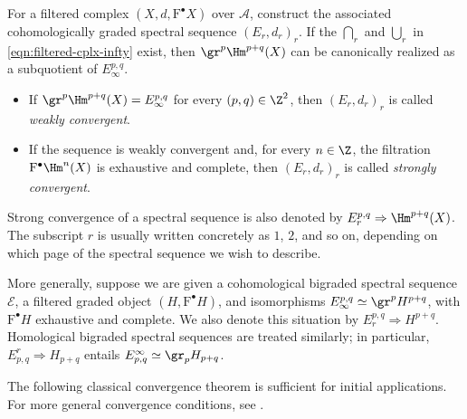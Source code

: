 \begin{definition}\label{def:filtered-cplx-convergence}
	For a filtered complex $(X,d,\mathrm{F}^\bullet X)$ over $\mathcal{A}$,
	construct the associated cohomologically graded spectral sequence
	$(E_r,d_r)_r$. If the $\bigcap_r$ and $\bigcup_r$ in
	\eqref{eqn:filtered-cplx-infty} exist, then
	$\gr^p\Hm^{p+q}(X)$ can be canonically realized as a subquotient of
	$E_\infty^{p,q}$.
	\begin{itemize}
		\item If $\gr^p\Hm^{p+q}(X)=E_\infty^{p,q}$ for every
		$(p,q)\in\Z^2$, then $(E_r,d_r)_r$ is called \emph{weakly convergent}.
		\item If the sequence is weakly convergent and, for every $n\in\Z$,
		the filtration $\mathrm{F}^\bullet\Hm^n(X)$ is exhaustive and complete,
		then $(E_r,d_r)_r$ is called \emph{strongly convergent}.
	\end{itemize}
\end{definition}

\begin{convention}\label{con:ss-conv}
	Strong convergence of a spectral sequence is also denoted by
	$E_r^{p,q}\Rightarrow\Hm^{p+q}(X)$. The subscript $r$ is usually written
	concretely as $1$, $2$, and so on, depending on which page of the spectral
	sequence we wish to describe.

	More generally, suppose we are given a cohomological bigraded spectral
	sequence $\mathscr{E}$, a filtered graded object
	$(H,\mathrm{F}^\bullet H)$, and isomorphisms
	$E_\infty^{p,q}\simeq\gr^pH^{p+q}$, with
	$\mathrm{F}^\bullet H$ exhaustive and complete. We also denote this
	situation by $E_r^{p,q}\Rightarrow H^{p+q}$. Homological bigraded spectral
	sequences are treated similarly; in particular,
	$E^r_{p,q}\Rightarrow H_{p+q}$ entails
	$E^\infty_{p,q}\simeq\gr_pH_{p+q}$.
\end{convention}

The following classical convergence theorem is sufficient for initial
applications. For more general convergence conditions, see \cite{Boa99}.

